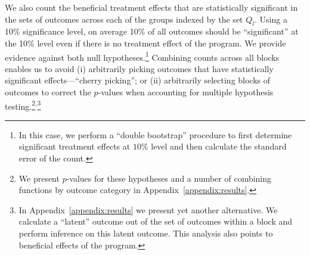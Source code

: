 We also count the beneficial treatment effects that are statistically significant in the sets of outcomes across each of the groups indexed by the set $Q_l$. Using a 10\% significance level, on average 10\% of all outcomes should be ``significant'' at the 10\% level even if there is no treatment effect of the program. We provide evidence against both null hypotheses.\footnote{In this case, we perform a ``double bootstrap'' procedure to first determine significant treatment effects at $10\%$ level and then calculate the standard error of the count.} Combining counts across all blocks enables us to avoid (i) arbitrarily picking outcomes that have statistically significant effects---``cherry picking''; or (ii) arbitrarily selecting blocks of outcomes to correct the $p$-values when accounting for multiple hypothesis testing.\footnote{We present $p$-values for these hypotheses and a number of combining functions by outcome category in Appendix~\ref{appendix:results}.}$^{\text{,}}$\footnote{In Appendix~\ref{appendix:results} we present yet another alternative. We calculate a ``latent'' outcome out of the set of outcomes within a block and perform inference on this latent outcome. This analysis also points to beneficial effects of the program.} 